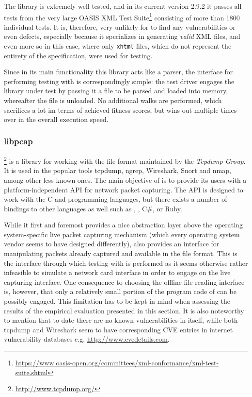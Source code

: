 The library is extremely well tested, and in its current version 2.9.2 it passes all tests from the very large
OASIS XML Test Suite\footnote{\url{https://www.oasis-open.org/committees/xml-conformance/xml-test-suite.shtml}}
consisting of more than 1800 individual tests. It is, therefore, very unlikely for \xmlmate to find any
vulnerabilities or even defects, especially because it specializes in generating \emph{valid} XML files, and
even more so in this case, where only \texttt{xhtml} files, which do not represent the entirety of the \xml
specification, were used for testing.

Since in its main functionality this library acts like a parser, the interface for performing testing with
\xmlmate is correspondingly simple: the test driver engages the library under test by passing it a file to be
parsed and loaded into memory, whereafter the file is unloaded. No additional walks are performed, which
sacrifices a lot im terms of achieved fitness scores, but wins out multiple times over in the
overall execution speed.


\tocless\subsubsection{libpcap}
\libpcap\footnote{\url{http://www.tcpdump.org/}} is a library for working with the \pcap file format
maintained by the \emph{Tcpdump Group}. It is used in the popular tools tcpdump, ngrep, Wireshark, Snort and
nmap, among other less known ones. The main objective of \libpcap is to provide its users with a
platform-independent API for network packet capturing. The API is designed to work with the {\small C} and \cpp
programming languages, but there exists a number of bindings to other languages as well such as \python, \java,
{\small C\#}, or {\small Ruby}.

While it first and foremost provides a nice abstraction layer above the operating system-specific live packet
capturing mechanism (which every operating system vendor seems to have designed differently), \libpcap
also provides an interface for manipulating packets already captured and available in the \pcap file format.
This is the interface through which testing with \xmlmate is performed as it seems otherwise rather
infeasible to simulate a network card interface in order to engage \libpng on the live capturing
interface. One consequence to choosing the offline  file reading interface is, however, that only a relatively
small portion of the program code of \libpcap can be possibly engaged. This limitation has to be kept
in mind when assessing the results of the empirical evaluation presented in this section. It is also noteworthy
to mention that to date there are no known vulnerabilities in \libpcap itself, while both tcpdump and
Wireshark seem to have corresponding CVE entries in internet vulnerability databases e.g.
\url{http://www.cvedetails.com}.

